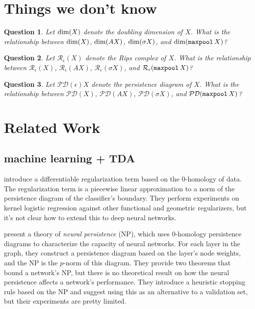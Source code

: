 \documentclass{article}
\newtheorem{question}{Question}
\newcommand{\defn}[1]{\textit{#1}}
\DeclareMathOperator{\maxpool}{\textup{\texttt{maxpool}}}
\DeclareMathOperator{\ddimop}{\textup{dim}}
\newcommand{\ddim}[1]{\ddimop(#1)}
\newcommand{\rips}[2]{\mathcal R_{#1}(#2)}
\newcommand{\pd}[1]{\mathcal {PD}(#1)}
\begin{document}

\section{Things we don't know}

\begin{question}
    Let $\ddim X$ denote the doubling dimension of $X$.
    What is the relationship between $\ddim X$, $\ddim {AX}$, $\ddim {\sigma X}$, and $\ddim{\maxpool X}$?
\end{question}

\begin{question}
    Let $\rips\epsilon X$ denote the Rips complex of $X$.
    What is the relationship between $\rips\epsilon X$, $\rips\epsilon {AX}$, $\rips\epsilon {\sigma X}$, and $\rips\epsilon{\maxpool X}$?
\end{question}

\begin{question}
    Let $\pd\epsilon X$ denote the persistence diagram of $X$.
    What is the relationship between $\pd X$, $\pd{AX}$, $\pd{\sigma X}$, and $\pd{\maxpool X}$?
\end{question}


\section{Related Work}

\subsection{machine learning + TDA}

\citet{chen2019topological} introduce a differentiable regularization term based on the 0-homology of data.
The regularization term is a piecewise linear approximation to a norm of the persistence diagram of the classifier's boundary.
They perform experiments on kernel logistic regression against other functional and geometric regularizers,
but it's not clear how to extend this to deep neural networks.

\citet{rieck2019neural} present a theory of \defn{neural persistence} (NP),
which uses 0-homology persistence diagrams to characterize the capacity of neural networks.
For each layer in the graph,
they construct a persistence diagram based on the layer's node weights,
and the NP is the $p$-norm of this diagram.
They provide two theorems that bound a network's NP,
but there is no theoretical result on how the neural persistence affects a network's performance.
They introduce a heuristic stopping rule based on the NP and suggest using this as an alternative to a validation set,
but their experiments are pretty limited.
\end{document}
